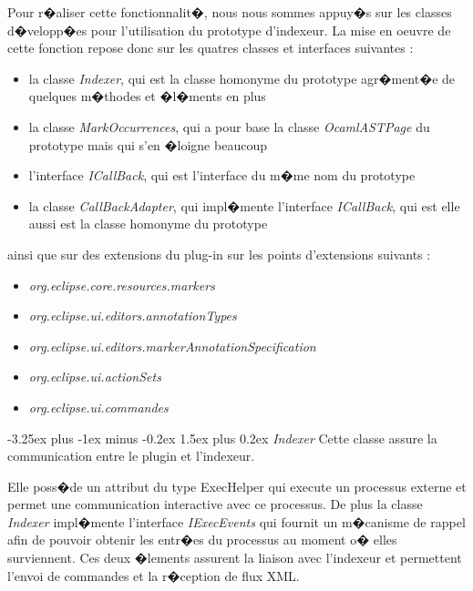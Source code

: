 \documentclass[a4paper,11pt,titlepage]{article}
\makeatletter
\renewcommand{\paragraph}{\@startsection{paragraph}{4}{0ex}%
   {-3.25ex plus -1ex minus -0.2ex}%
   {1.5ex plus 0.2ex}%
   {\normalfont\normalsize\bfseries}}
\makeatother
\begin{document}
Pour r�aliser cette fonctionnalit�, nous nous sommes appuy�s sur les classes d�velopp�es pour l'utilisation du prototype d'indexeur. La mise en oeuvre de cette fonction repose donc sur les quatres classes et interfaces suivantes : 
\begin{itemize}
	\item la classe \textit{Indexer}, qui est la classe homonyme du prototype agr�ment�e de quelques m�thodes et �l�ments en plus
	\item la classe \textit{MarkOccurrences}, qui a pour base la classe \textit{OcamlASTPage} du prototype mais qui s'en �loigne beaucoup
	\item l'interface \textit{ICallBack}, qui est l'interface du m�me nom du prototype
	\item la classe \textit{CallBackAdapter}, qui impl�mente l'interface \textit{ICallBack}, qui est elle aussi est la classe homonyme du prototype
\end{itemize}
ainsi que sur des extensions du plug-in sur les points d'extensions suivants : 
\begin{itemize}
	\item \textit{org.eclipse.core.resources.markers}
	\item \textit{org.eclipse.ui.editors.annotationTypes}
	\item \textit{org.eclipse.ui.editors.markerAnnotationSpecification}
	\item \textit{org.eclipse.ui.actionSets}
	\item \textit{org.eclipse.ui.commandes}
\end{itemize}
\paragraph{\textit{Indexer}} Cette classe assure la communication entre le plugin et l'indexeur.

Elle poss�de un attribut du type ExecHelper qui execute un processus externe et permet une communication interactive avec ce processus. De plus la classe \textit{Indexer} impl�mente l'interface \textit{IExecEvents} qui fournit un m�canisme de rappel afin de pouvoir obtenir les entr�es du processus au moment o� elles surviennent. Ces deux �lements assurent la liaison avec l'indexeur et permettent l'envoi de commandes et la r�ception de flux XML.\\
\end{document}
